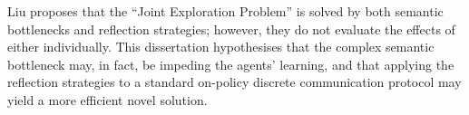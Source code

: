 Liu proposes that the ``Joint Exploration Problem'' is solved by both semantic bottlenecks and reflection strategies; however, they do not evaluate the effects of either individually.
This dissertation hypothesises that the complex semantic bottleneck may, in fact, be impeding the agents' learning, and that applying the reflection strategies to a standard on-policy discrete communication protocol may yield a more efficient novel solution.










